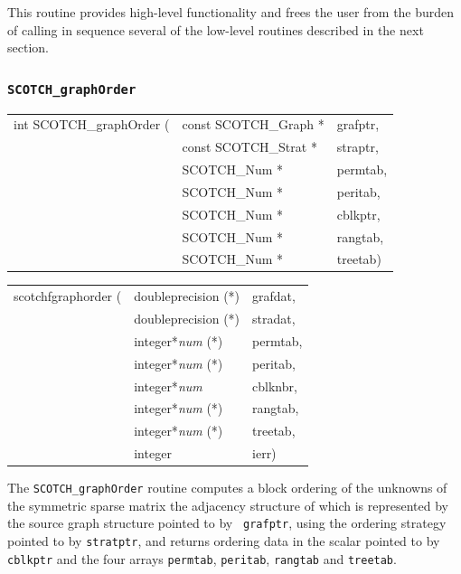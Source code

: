 This routine provides high-level functionality and frees the
user from the burden of calling in sequence several of the low-level
routines described in the next section.

\subsubsection{{\tt SCOTCH\_graphOrder}}

\begin{itemize}
\progsyn

{\tt\begin{tabular}{l@{}ll}
int SCOTCH\_graphOrder ( & const SCOTCH\_Graph * & grafptr, \\
                         & const SCOTCH\_Strat * & straptr, \\
                         & SCOTCH\_Num *         & permtab, \\
                         & SCOTCH\_Num *         & peritab, \\
                         & SCOTCH\_Num *         & cblkptr, \\
                         & SCOTCH\_Num *         & rangtab, \\
                         & SCOTCH\_Num *         & treetab)
\end{tabular}}

{\tt\begin{tabular}{l@{}ll}
scotchfgraphorder ( & doubleprecision (*)   & grafdat, \\
                    & doubleprecision (*)   & stradat, \\
                    & integer*{\it num} (*) & permtab, \\
                    & integer*{\it num} (*) & peritab, \\
                    & integer*{\it num}     & cblknbr, \\
                    & integer*{\it num} (*) & rangtab, \\
                    & integer*{\it num} (*) & treetab, \\
                    & integer               & ierr)
\end{tabular}}

\progdes

The {\tt SCOTCH\_graphOrder} routine computes a block ordering of the
unknowns of the symmetric sparse matrix the adjacency structure of
which is represented by the source graph structure pointed to by {\tt
grafptr}, using the ordering strategy pointed to by {\tt stratptr},
and returns ordering data in the scalar pointed to by {\tt cblkptr}
and the four arrays {\tt permtab}, {\tt peritab}, {\tt rangtab} and
{\tt treetab}.


\end{itemize}
